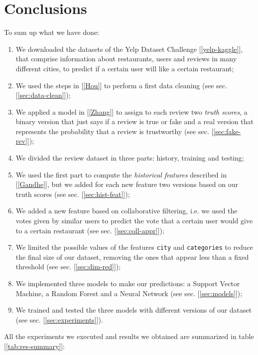 
\section{Conclusions}

To sum up what we have done:
\begin{enumerate}
    \item We downloaded the datasets of the Yelp Dataset Challenge [\ref{yelp-kaggle}], that comprise information about restaurants, users and reviews in many different cities, to predict if a certain user will like a certain restaurant;
    \item We used the steps in [\ref{Hou}] to perform a first data cleaning (see sec. [\ref{sec:data-clean}]);
    \item We applied a model in [\ref{Zhang}] to assign to each review two \textit{truth scores}, a binary version that just says if a review is true or fake and a real version that represents the probability that a review is trustworthy (see sec. [\ref{sec:fake-rev}]);
    \item We divided the review dataset in three parts: history, training and testing;
    \item We used the first part to compute the \textit{historical features} described in [\ref{Gandhe}], but we added for each new feature two versions based on our truth scores (see sec. [\ref{sec:hist-feat}]);
    \item We added a new feature based on collaborative filtering, i.e. we used the votes given by similar users to predict the vote that a certain user would give to a certain restaurant (see sec. [\ref{sec:coll-appr}]);
    \item We limited the possible values of the features \texttt{city} and \texttt{categories} to reduce the final size of our dataset, removing the ones that appear less than a fixed threshold (see sec. [\ref{sec:dim-red}]);
    \item We implemented three models to make our predictions: a Support Vector Machine, a Random Forest and a Neural Network (see sec. [\ref{sec:models}]);
    \item We trained and tested the three models with different versions of our dataset (see sec. [\ref{sec:experiments}]).
\end{enumerate}

All the experiments we executed and results we obtained are summarized in table [\ref{tab:res-summary}]:

